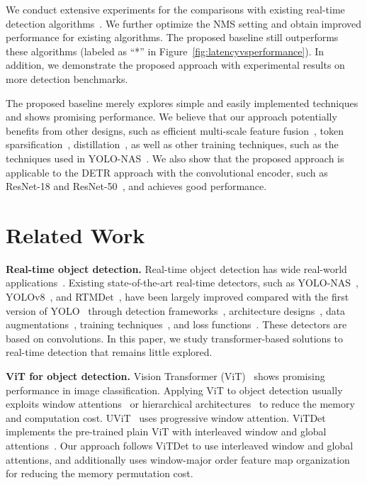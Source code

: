 \documentclass[runningheads]{llncs}
\begin{document}
We conduct extensive experiments for the comparisons with existing real-time detection algorithms~\cite{supergradients,yolov8_ultralytics,lyu2022rtmdet,chen2023yolo,wang2023gold}. We further optimize the NMS setting and obtain improved performance for existing algorithms. The proposed baseline still outperforms these algorithms (labeled as ``*'' in Figure~\ref{fig:latencyvsperformance}). In addition, we demonstrate the proposed approach with experimental results on more detection benchmarks.

The proposed baseline merely explores simple and easily implemented techniques and shows promising performance. We believe that our approach potentially benefits from other designs, such as efficient multi-scale feature fusion~\cite{li2023lite}, token sparsification~\cite{zheng2023less,li2022exploring}, distillation~\cite{chang2023detrdistill,chen2022d,chang2023detrdistill,wang2022knowledge}, as well as other training techniques, such as the techniques used in YOLO-NAS~\cite{supergradients}. We also show that the proposed approach is applicable to the DETR approach with the convolutional encoder, such as ResNet-18 and ResNet-50~\cite{he2016deep}, and achieves good performance.

\section{Related Work}
\noindent\textbf{Real-time object detection.} 
Real-time object detection has wide real-world applications~\cite{li2019gs3d,feng2020deep,hu2023planning,karaoguz2019object,paul2021object}. 
Existing state-of-the-art real-time detectors, such as YOLO-NAS~\cite{supergradients}, YOLOv8~\cite{yolov8_ultralytics}, and RTMDet~\cite{lyu2022rtmdet}, have been largely improved compared with the first version of YOLO~\cite{redmon2016you} through
detection frameworks~\cite{tian2019fcos,ge2021yolox}, architecture designs~\cite{bochkovskiy2020yolov4,li2022yolov6,li2023yolov6,xu2022pp,ding2021repvgg,wang2023yolov7}, data augmentations~\cite{zhang2017mixup,bochkovskiy2020yolov4,ge2021yolox}, training techniques~\cite{ge2021yolox,yolov8_ultralytics,supergradients}, and loss functions~\cite{lin2017focal,zhang2021varifocalnet,zheng2020distance}. 
These detectors are based 
on convolutions.
In this paper,
we study transformer-based solutions to real-time detection that remains little explored.
\vspace{1mm}

\noindent\textbf{ViT for object detection.} 
Vision Transformer (ViT)~\cite{dosovitskiy2020image,zhai2022scaling} shows promising performance in image classification.
Applying ViT to object detection 
usually exploits
window attentions~\cite{dosovitskiy2020image,liu2021swin}
or hierarchical architectures~\cite{wang2021pyramid,liu2021swin,zhang2022hivit,hatamizadeh2023fastervit}
to reduce the memory
and computation cost.
UViT~\cite{chen2021simple} 
uses progressive window attention.
ViTDet~\cite{li2022exploring} implements the pre-trained plain ViT with interleaved window and global attentions~\cite{li2021benchmarking}. 
Our approach follows ViTDet 
to use interleaved window
and global attentions,
and additionally uses window-major order feature map organization
for reducing the memory permutation cost. 
\end{document}

